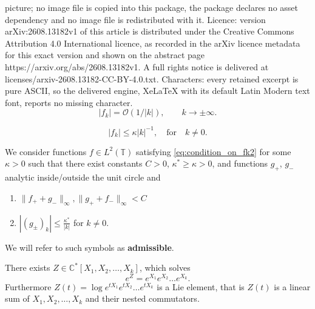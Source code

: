 \documentclass[10pt,a4paper]{amsart}
\begin{document}
picture; no image file is copied into this package, the package declares no asset dependency and no image file is redistributed with it. Licence: version arXiv:2608.13182v1 of this article is distributed under the Creative Commons Attribution 4.0 International licence, as recorded in the arXiv licence metadata for this exact version and shown on the abstract page https://arxiv.org/abs/2608.13182v1. A full rights notice is delivered at licenses/arxiv-2608.13182-CC-BY-4.0.txt. Characters: every retained excerpt is pure ASCII, so the delivered engine, XeLaTeX with its default Latin Modern text font, reports no missing character.
\begin{equation}\label{eq:condition_on_fk}
|f_k| = \mathcal O(1/|k|), \qquad k \to \pm \infty.
\end{equation}

\begin{equation}\label{eq:condition_on_fk2}
|f_k|\leq \kappa |k|^{-1}, \quad\text{for}\quad k\not=0.
\end{equation}

\begin{definition}\label{def:nehari_complete}
We consider functions $f\in L^2(\mathbb{T})$ satisfying \eqref{eq:condition_on_fk2} for some $\kappa>0$ such that there exist constants $C>0$, $\kappa^*\geq \kappa>0$, and functions $g_+$, $g_-$ analytic inside/outside the unit circle and
\begin{enumerate} 
\item[i)] \label{cond:boundedness}
$\|f_++g_-\|_{\infty}, \|g_++f_-\|_{\infty}< C$
\item[ii)] \label{cond:fourier}
$|(g_{\pm})_k|\leq \frac{\kappa^*}{|k|}$ for $k\not=0$.
\end{enumerate}
We will refer to such symbols as \textbf{admissible}. 
\end{definition}

\begin{theorem}\label{thm:k-commutators}
There exists $Z\in\mathbb{C}^*[X_1,X_2,\ldots, X_k]$, which solves 
$$e^Z=e^{X_1}e^{X_2}\ldots e^{X_k}.$$
Furthermore $Z(t)= \log e^{tX_1}e^{tX_2}\ldots e^{tX_k}$ is a Lie element, that is $Z(t)$ is a linear sum of $X_1, X_2, \ldots, X_k$ and their nested commutators. 
\end{theorem}
\end{document}
